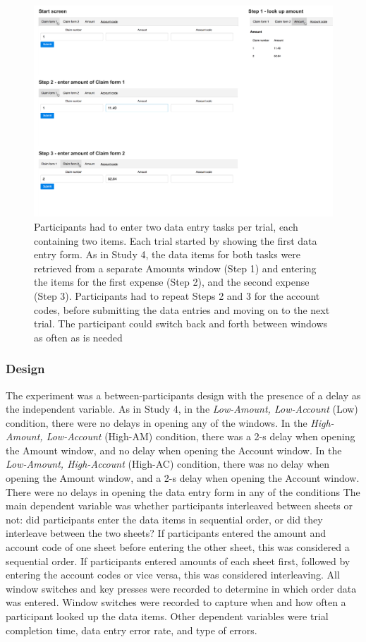 \begin{figure}
\includegraphics[width=\textwidth]{images/ch34/ch34-5_Tasksequence.pdf}
    \caption[Study 5 data entry task layout]{Participants had to enter two data entry tasks per trial, each containing two items. Each trial started by showing the first data entry form. As in Study 4, the data items for both tasks were retrieved from a separate Amounts window (Step 1) and entering the items for the first expense (Step 2), and the second expense (Step 3). Participants had to repeat Steps 2 and 3 for the account codes, before submitting the data entries and moving on to the next trial. The participant could switch back and forth between windows as often as is needed}\label{fig:ch34_5-tasklayout}
\end{figure}

\subsubsection{Design}
The experiment was a between-participants design with the presence of a delay as the independent variable. 
As in Study 4, in the \textit{Low-Amount, Low-Account} (Low) condition, there were no delays in opening any of the windows. In the \textit{High-Amount, Low-Account} (High-AM) condition, there was a 2-s delay when opening the Amount window, and no delay when opening the Account window. In the \textit{Low-Amount, High-Account} (High-AC) condition, there was no delay when opening the Amount window, and a 2-s delay when opening the Account window. There were no delays in opening the data entry form in any of the conditions 
The main dependent variable was whether participants interleaved between sheets or not: did participants enter the data items in sequential order, or did they interleave between the two sheets? If participants entered the amount and account code of one sheet before entering the other sheet, this was considered a sequential order. If participants entered amounts of each sheet first, followed by entering the account codes or vice versa, this was considered interleaving. All window switches and key presses were recorded to determine in which order data was entered. Window switches were recorded to capture when and how often a participant looked up the data items. Other dependent variables were trial completion time, data entry error rate, and type of errors.

